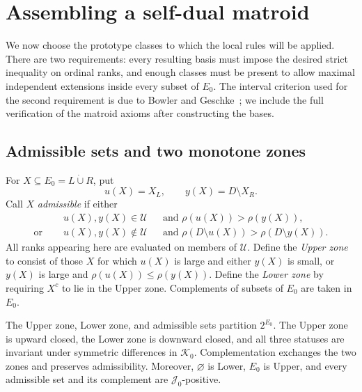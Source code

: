 \section{Assembling a self-dual matroid}\label{sec:assembly}

We now choose the prototype classes to which the local rules will be applied.
There are two requirements: every resulting basis must impose the desired
strict inequality on ordinal ranks, and enough classes must be present to
allow maximal independent extensions inside every subset of $E_0$.
The interval criterion used for the second requirement is due to
Bowler and Geschke~\cite[Theorem~6]{BowlerGeschke2016}; we include the full
verification of the matroid axioms after constructing the bases.

\subsection{Admissible sets and two monotone zones}

For $X\subseteq E_0=L\dot\cup R$, put
\[
 u(X)=X_L,\qquad y(X)=D\setminus X_R.
\]
Call $X$ \emph{admissible} if either
\begin{equation}\label{eq:admissible}
 \begin{aligned}
 &u(X),y(X)\in\mathcal U
       &&\text{and }\rho(u(X))>\rho(y(X)),\\
 \text{or }\quad
 &u(X),y(X)\notin\mathcal U
       &&\text{and }\rho(D\setminus u(X))>
                         \rho(D\setminus y(X)).
 \end{aligned}
\end{equation}
All ranks appearing here are evaluated on members of $\mathcal U$.
Define the \emph{Upper zone} to consist of those $X$ for which $u(X)$ is
large and either $y(X)$ is small, or $y(X)$ is large and
$\rho(u(X))\le\rho(y(X))$.
Define the \emph{Lower zone} by requiring $X^c$ to lie in the Upper zone.
Complements of subsets of $E_0$ are taken in $E_0$.

\begin{lemma}\label{lem:zones}
The Upper zone, Lower zone, and admissible sets partition $2^{E_0}$.
The Upper zone is upward closed, the Lower zone is downward closed,
and all three statuses are invariant under symmetric differences in
$\mathcal K_0$.
Complementation exchanges the two zones and preserves admissibility.
Moreover, $\varnothing$ is Lower, $E_0$ is Upper, and every admissible
set and its complement are $\mathcal J_0$-positive.
\end{lemma}

